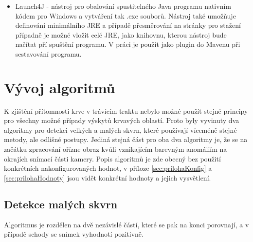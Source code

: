 \begin{itemize}
	\item Launch4J - nástroj pro obalování spustitelného Java programu nativním kódem pro Windows a vytváření tak .exe souborů. Nástroj také umožňuje definování minimálního JRE a případě přesměrování na stránky pro stažení případně je možné vložit celé JRE, jako knihovnu, kterou nástroj bude načítat pří spuštění programu.\cite{launch4j} V práci je použit jako plugin do Mavenu při sestavování programu.
\end{itemize}

\section{Vývoj algoritmů}
K zjištění přítomnosti krve v trávícím traktu nebylo možné použít stejné principy pro všechny možné případy výskytů krvavých oblastí. Proto byly vyvinuty dva algoritmy pro detekci velkých a malých skvrn, které používají víceméně stejné metody, ale odlišné postupy. Jediná stejná část pro oba dva algoritmy je, že se na začátku zpracování ořízne obraz kvůli vznikajícím barevným anomáliím na okrajích snímací části kamery.
Popis algoritmů je zde obecný bez použití konkrétních nakonfigurovaných hodnot, v příloze \ref{sec:prilohaKonfig} a \ref{sec:prilohaHodnoty} jsou vidět konkrétní hodnoty a jejich vysvětlení.
\subsection{Detekce malých skvrn}
Algoritmus je rozdělen na dvě nezávislé částí, které se pak na konci porovnají, a v případě schody se snímek vyhodnotí pozitivně.


